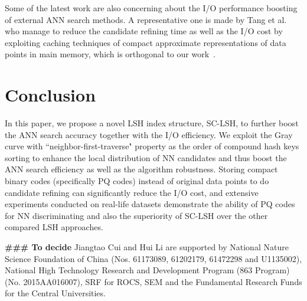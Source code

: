 \documentclass[twocolumn]{svjour3}          %
\begin{document}
Some of the latest work are also concerning about the I/O performance boosting of external ANN search methods. A representative one is made by Tang et al. who manage to reduce the candidate refining time as well as the I/O cost by exploiting caching techniques of compact approximate representations of data points in main memory, which is orthogonal to our work~\cite{Tang2016Exploit}.



\section{Conclusion}\label{sec:conclusion}
In this paper, we propose a novel LSH index structure, SC-LSH, to further boost the ANN search accuracy together with the I/O efficiency. We exploit the Gray curve with ``neighbor-first-traverse" property as the order of compound hash keys sorting to enhance the local distribution of NN candidates and thus boost the ANN search efficiency as well as the algorithm robustness. Storing compact binary codes (specifically PQ codes) instead of original data points to do candidate refining can significantly reduce the I/O cost, and extensive experiments conducted on real-life datasets demonstrate the ability of PQ codes for NN discriminating and also the superiority of SC-LSH over the other compared LSH approaches.


\begin{acknowledgements}
\textbf{\#\#\# To decide} Jiangtao Cui and Hui Li are supported by National Nature Science Foundation of China (Nos. 61173089, 61202179, 61472298 and U1135002), National High Technology Research and Development Program (863 Program) (No. 2015AA016007), SRF for ROCS, SEM and the Fundamental Research Funds for the Central Universities.
\end{acknowledgements}

 
\end{document}
